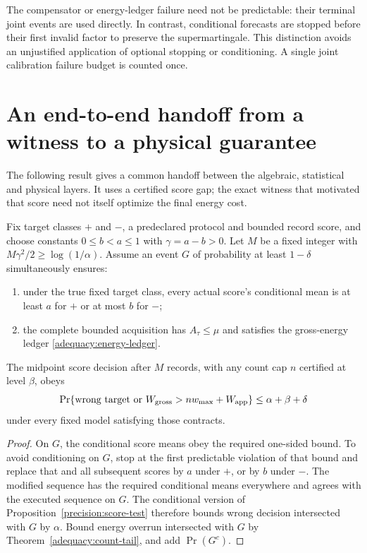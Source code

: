 The compensator or energy-ledger failure need not be predictable: their terminal
joint events are used directly. In contrast, conditional forecasts are stopped
before their first invalid factor to preserve the supermartingale. This
distinction avoids an unjustified application of optional stopping or
conditioning. A single joint calibration failure budget is counted once.

\section{An end-to-end handoff from a witness to a physical guarantee}

The following result gives a common handoff between the algebraic, statistical
and physical layers. It uses a certified score gap; the exact witness that
motivated that score need not itself optimize the final energy cost.

\begin{corollary}
\label{adequacy:handoff}
Fix target classes $+$ and $-$, a predeclared protocol and bounded record score,
and choose constants $0\leq b<a\leq1$ with $\gamma=a-b>0$.
Let $M$ be a fixed integer with
$M\gamma^2/2\geq\log(1/\alpha)$. Assume an event $G$ of probability at least
$1-\delta$ simultaneously ensures:
\begin{enumerate}
 \item under the true fixed target class, every actual score's conditional
 mean is at least $a$ for $+$ or at most $b$ for $-$;
 \item the complete bounded acquisition has $A_\tau\leq\mu$ and satisfies
 the gross-energy ledger \eqref{adequacy:energy-ledger}.
\end{enumerate}
The midpoint score decision after $M$ records, with any count cap $n$ certified
at level $\beta$, obeys
\begin{equation}
 \Pr\{\text{wrong target or }W_{\rm gross}>nw_{\max}+W_{\rm app}\}
 \leq\alpha+\beta+\delta
 \label{adequacy:handoff-equation}
\end{equation}
under every fixed model satisfying those contracts.
\end{corollary}
\begin{proof}
On $G$, the conditional score means obey the required one-sided bound. To avoid
conditioning on $G$, stop at the first predictable violation of that bound and
replace that and all subsequent scores by $a$ under $+$, or by $b$ under $-$.
The modified sequence has the required conditional means everywhere and agrees
with the executed sequence on $G$. The conditional version of
Proposition~\ref{precision:score-test} therefore bounds wrong decision
intersected with $G$ by $\alpha$. Bound energy overrun intersected with $G$
by Theorem~\ref{adequacy:count-tail}, and add $\Pr(G^c)$.
\end{proof}

